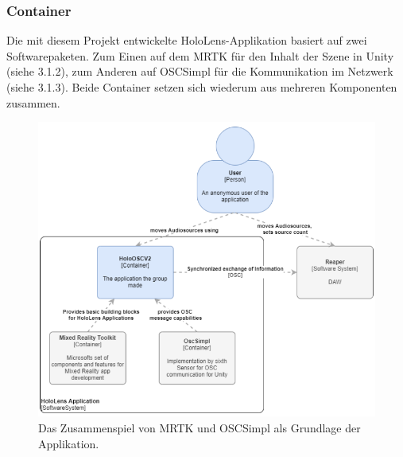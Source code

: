 \documentclass[11pt, titlepage, fleqn]{report}
\begin{document}
                \subsubsection*{Container}
                    Die mit diesem Projekt entwickelte HoloLens-Applikation basiert auf zwei Softwarepaketen. Zum Einen auf dem MRTK für 
                    den Inhalt der Szene in Unity (siehe 3.1.2), zum Anderen auf OSCSimpl für die Kommunikation im Netzwerk (siehe 3.1.3). 
                    Beide Container setzen sich wiederum aus mehreren Komponenten zusammen.
                    \begin{figure}[htbp]
                        \centering
                        \includegraphics[width=14cm]{./img/container.png}
                        \caption{Das Zusammenspiel von MRTK und OSCSimpl als Grundlage der Applikation. \label{fig:containerPic}}
                    \end{figure}
\end{document}

